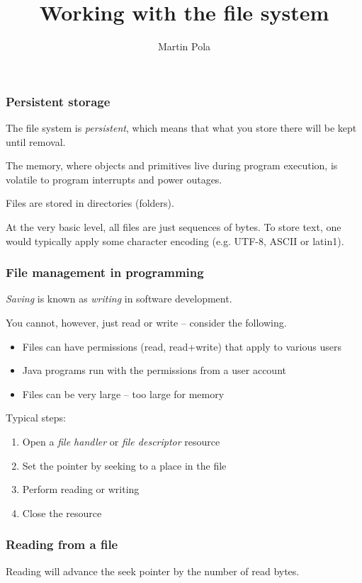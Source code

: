 \documentclass{beamer}
\title{Working with the file system}
\author{Martin Pola}
\date{}
\begin{document}
	\maketitle
	
	\frame
	{
		\frametitle{Persistent storage}

		The file system is \emph{persistent}, which means that what you store there will be kept until removal.

		The memory, where objects and primitives live during program execution, is volatile to program interrupts and power outages.

		\pause
		Files are stored in directories (folders).
		
		At the very basic level, all files are just sequences of bytes. To store text, one would typically apply some character encoding (e.g. UTF-8, ASCII or latin1).
	}

	\begin{frame}
		\frametitle{File management in programming}

		\emph{Saving} is known as \emph{writing} in software development.

		You cannot, however, just read or write -- consider the following.

		\begin{itemize}
			\item Files can have permissions (read, read+write) that apply to various users
			\item Java programs run with the permissions from a user account
			\pause
			\item Files can be very large -- too large for memory
		\end{itemize}

		Typical steps:

		\begin{enumerate}
			\item Open a \emph{file handler} or \emph{file descriptor} resource
			\item Set the pointer by seeking to a place in the file
			\item Perform reading or writing
			\item Close the resource
		\end{enumerate}
	\end{frame}

	\begin{frame}
		\frametitle{Reading from a file}
		

		Reading will advance the seek pointer by the number of read bytes.
	\end{frame}
\end{document}
